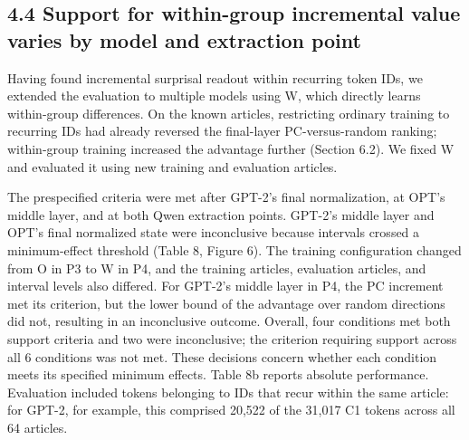\FloatBarrier

\subsection{4.4 Support for within-group incremental value varies by model and extraction point}\label{support-for-within-group-incremental-value-varies-by-model-and-extraction-point}

Having found incremental surprisal readout within recurring token IDs, we extended the evaluation to multiple models using W, which directly learns within-group differences. On the known articles, restricting ordinary training to recurring IDs had already reversed the final-layer PC-versus-random ranking; within-group training increased the advantage further (Section 6.2). We fixed W and evaluated it using new training and evaluation articles.

The prespecified criteria were met after GPT-2's final normalization, at OPT's middle layer, and at both Qwen extraction points. GPT-2's middle layer and OPT's final normalized state were inconclusive because intervals crossed a minimum-effect threshold (Table 8, Figure 6). The training configuration changed from O in P3 to W in P4, and the training articles, evaluation articles, and interval levels also differed. For GPT-2's middle layer in P4, the PC increment met its criterion, but the lower bound of the advantage over random directions did not, resulting in an inconclusive outcome. Overall, four conditions met both support criteria and two were inconclusive; the criterion requiring support across all 6 conditions was not met. These decisions concern whether each condition meets its specified minimum effects. Table 8b reports absolute performance. Evaluation included tokens belonging to IDs that recur within the same article: for GPT-2, for example, this comprised 20,522 of the 31,017 C1 tokens across all 64 articles.

